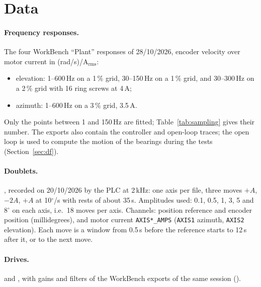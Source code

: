 \documentclass[10pt,a4paper]{article}
\numberwithin{equation}{section}
\begin{document}
\tableofcontents

\section{Data}\label{sec:data}
\paragraph{Frequency responses.} The four WorkBench ``Plant'' responses of 28/10/2026, encoder velocity over motor current in (rad/s)/A$_\mathrm{rms}$:
\begin{itemize}
\item elevation: 1--600\,Hz on a 1\,\% grid, 30--150\,Hz on a 1\,\% grid, and 30--300\,Hz on a 2\,\% grid with 16 ring screws at 4\,A;
\item azimuth: 1--600\,Hz on a 3\,\% grid, 3.5\,A.
\end{itemize}
Only the points between 1 and 150\,Hz are fitted; Table~\ref{tab:sampling} gives their number. The exports also contain the controller and open-loop traces; the open loop is used to compute the motion of the bearings during the tests (Section~\ref{sec:df}).

\paragraph{Doublets.} , recorded on 20/10/2026 by the PLC at 2\,kHz: one axis per file, three moves $+A$, $-2A$, $+A$ at 10$^\circ$/s with rests of about 35\,s. Amplitudes used: 0.1, 0.5, 1, 3, 5 and 8$^\circ$ on each axis, i.e.\ 18 moves per axis. Channels: position reference and encoder position (millidegrees), and motor current \texttt{AXIS*\_AMPS} (\texttt{AXIS1} azimuth, \texttt{AXIS2} elevation). Each move is a window from 0.5\,s before the reference starts to 12\,s after it, or to the next move.

\paragraph{Drives.}  and , with gains and filters of the WorkBench exports of the same session ().


\end{document}
